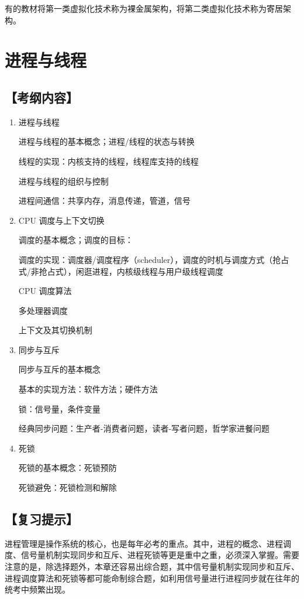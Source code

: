 \documentclass{ctexbook}
\begin{document}
		有的教材将第一类虚拟化技术称为裸金属架构，将第二类虚拟化技术称为寄居架构。

	\chapter{进程与线程}
	
	\section*{【考纲内容】}
	
	\begin{enumerate}
		\item 进程与线程
		
		
进程与线程的基本概念；进程/线程的状态与转换
		
线程的实现：内核支持的线程，线程库支持的线程
		
进程与线程的组织与控制
		
进程间通信：共享内存，消息传递，管道，信号
		
		\item CPU 调度与上下文切换
		
		
调度的基本概念；调度的目标：
		
		
调度的实现：调度器/调度程序（scheduler），调度的时机与调度方式（抢占式/非抢占式），闲逛进程，内核级线程与用户级线程调度
		
		
CPU 调度算法
		
多处理器调度
		
上下文及其切换机制
		
		\item 同步与互斥
		
		
同步与互斥的基本概念
		
基本的实现方法：软件方法；硬件方法
		
锁：信号量，条件变量
		
经典同步问题：生产者-消费者问题，读者-写者问题，哲学家进餐问题
		
		\item 死锁
		
		
死锁的基本概念：死锁预防
		
死锁避免：死锁检测和解除
		
	\end{enumerate}
	
	\section*{【复习提示】}
	
	进程管理是操作系统的核心，也是每年必考的重点。其中，进程的概念、进程调度、信号量机制实现同步和互斥、进程死锁等更是重中之重，必须深入掌握。需要注意的是，除选择题外，本章还容易出综合题，其中信号量机制实现同步和互斥、进程调度算法和死锁等都可能命制综合题，如利用信号量进行进程同步就在往年的统考中频繁出现。
	
\end{document}
